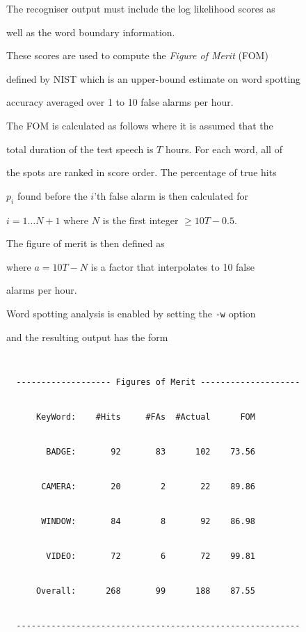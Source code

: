 The recogniser output must include the log likelihood scores as


well as the word boundary information.  


These scores are used to compute the \textit{Figure of Merit} (FOM)


defined by NIST which is an upper-bound estimate on word spotting


accuracy averaged over 1 to 10 false alarms per hour.


The FOM is calculated  as follows where it is assumed that the


total duration of the test speech is $T$ hours.  For each word, all of


the spots are ranked in score order.  The percentage of true hits


$p_i$ found before the $i$'th false alarm is then calculated for 


$i = 1 \ldots N+1$ where $N$ is the first integer $\ge 10T - 0.5$.


The figure of merit is then defined as




where $a = 10T - N$ is a factor that interpolates to 10 false


alarms per hour.





Word spotting analysis is enabled by setting the \texttt{-w} option


and the resulting output has the form


\begin{verbatim}


  ------------------- Figures of Merit --------------------


      KeyWord:    #Hits     #FAs  #Actual      FOM


        BADGE:       92       83      102    73.56


       CAMERA:       20        2       22    89.86


       WINDOW:       84        8       92    86.98


        VIDEO:       72        6       72    99.81


      Overall:      268       99      188    87.55


  ---------------------------------------------------------


\end{verbatim}


